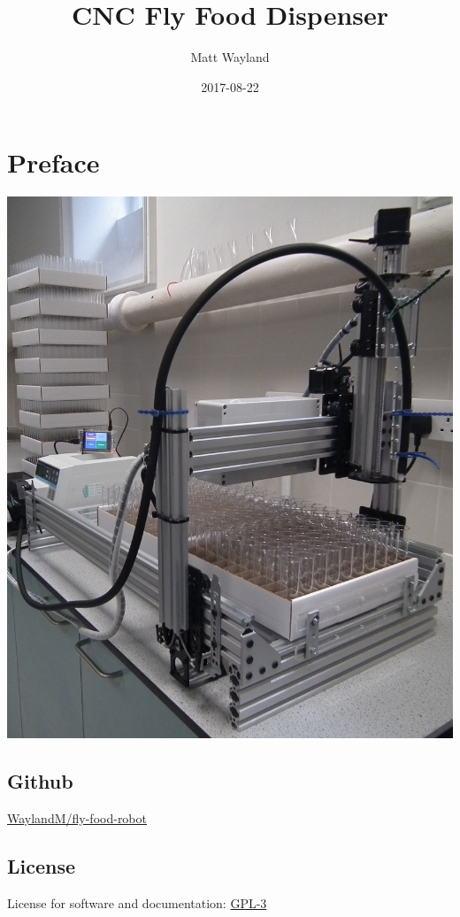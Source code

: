 \documentclass[]{book}
\title{CNC Fly Food Dispenser}
\author{Matt Wayland}
\date{2017-08-22}
\theoremstyle{definition}
\theoremstyle{definition}
\theoremstyle{remark}
\begin{document}
\maketitle

{
\setcounter{tocdepth}{1}
\tableofcontents
}
\chapter*{Preface}\label{preface}

\begin{center}\includegraphics[width=0.75\linewidth]{images/system} \end{center}

\section*{Github}\label{github}

\href{https://github.com/WaylandM/fly-food-robot}{WaylandM/fly-food-robot}

\section*{License}\label{license}

License for software and documentation:
\href{https://www.gnu.org/licenses/gpl-3.0.en.html}{GPL-3}
\end{document}
